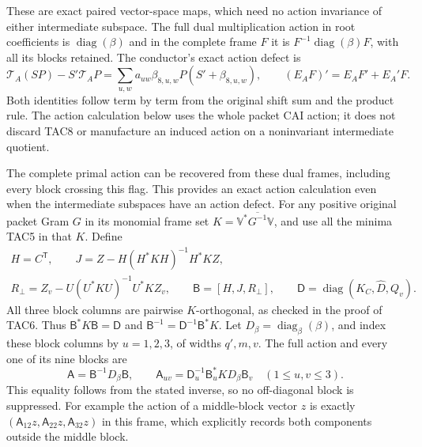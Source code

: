 These are exact paired vector-space maps, which need no action
invariance of either intermediate subspace.  The full dual multiplication
action in root coefficients is $\operatorname{diag}(\beta)$ and in
the complete frame $F$ it is
$F^{-1}\operatorname{diag}(\beta)F$, with all its blocks retained.
The conductor's exact action defect is
\[
 \mathcal T_A(SP)-S'\mathcal T_AP
       =\sum_{u,w}a_{uw}\beta_{8,u,w}P(S'+\beta_{8,u,w}),
 \qquad (E_AF)'=E_AF'+E_A'F.
 \tag{TAC8}
\]
Both identities follow term by term from the original shift sum and
the product rule.  The action calculation below uses the whole packet
CAI action; it does not discard TAC8 or manufacture an induced action
on a noninvariant intermediate quotient.


The complete primal action can be recovered from these dual frames,
including every block crossing this flag. This provides an exact action
calculation even when the intermediate subspaces have an action defect.
For any positive original packet Gram $G$ in its monomial frame set
$K=\mathbb V^*\overline{G^{-1}}\mathbb V$, and use all the minima
TAC5 in that $K$. Define
\[
\begin{gathered}
 H=C^{\mathsf T},\qquad
 J=Z-H(H^*KH)^{-1}H^*KZ,\\
 R_\perp=Z_v-U(U^*KU)^{-1}U^*KZ_v,\qquad
 \mathsf B=[H,J,R_\perp],\qquad
 \mathsf D=\operatorname{diag}(K_C,\widehat D,Q_v).
\end{gathered}\tag{TAC8a}
\]
All three block columns are pairwise $K$-orthogonal, as checked in the
proof of TAC6. Thus $\mathsf B^*K\mathsf B=\mathsf D$ and
$\mathsf B^{-1}=\mathsf D^{-1}\mathsf B^*K$. Let
$D_\beta=\operatorname{diag}_{\beta}(\beta)$, and index these block
columns by $u=1,2,3$, of widths $q',m,v$. The full action and every
one of its nine blocks are
\[
 \mathsf A=\mathsf B^{-1}D_\beta\mathsf B,
 \qquad
 \mathsf A_{uv}=\mathsf D_u^{-1}\mathsf B_u^*KD_\beta\mathsf B_v
       \quad(1\le u,v\le3).
 \tag{TAC8b}
\]
This equality follows from the stated inverse, so no off-diagonal
block is suppressed. For example the action of a middle-block vector
$z$ is exactly $(\mathsf A_{12}z,\mathsf A_{22}z,\mathsf A_{32}z)$
in this frame, which explicitly records both components outside the
middle block.

